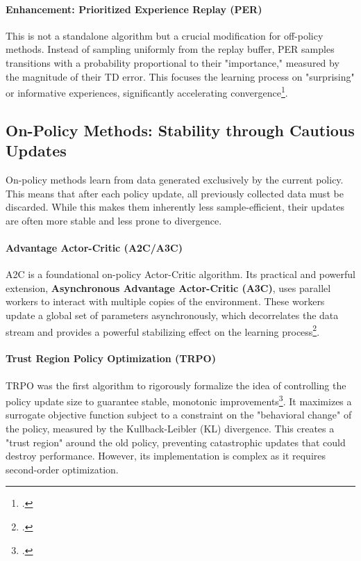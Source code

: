 \paragraph{Enhancement: Prioritized Experience Replay (PER)}
This is not a standalone algorithm but a crucial modification for off-policy methods. Instead of sampling uniformly from the replay buffer, PER samples transitions with a probability proportional to their "importance," measured by the magnitude of their TD error. This focuses the learning process on "surprising" or informative experiences, significantly accelerating convergence\footcite{schaul2015prioritized}.

\subsection{On-Policy Methods: Stability through Cautious Updates}
On-policy methods learn from data generated exclusively by the current policy. This means that after each policy update, all previously collected data must be discarded. While this makes them inherently less sample-efficient, their updates are often more stable and less prone to divergence.

\paragraph{Advantage Actor-Critic (A2C/A3C)}
A2C is a foundational on-policy Actor-Critic algorithm. Its practical and powerful extension, \textbf{Asynchronous Advantage Actor-Critic (A3C)}, uses parallel workers to interact with multiple copies of the environment. These workers update a global set of parameters asynchronously, which decorrelates the data stream and provides a powerful stabilizing effect on the learning process\footcite{mnih2016asynchronous}.

\paragraph{Trust Region Policy Optimization (TRPO)}
TRPO was the first algorithm to rigorously formalize the idea of controlling the policy update size to guarantee stable, monotonic improvements\footcite{schulman2015trust}. It maximizes a surrogate objective function subject to a constraint on the "behavioral change" of the policy, measured by the Kullback-Leibler (KL) divergence. This creates a "trust region" around the old policy, preventing catastrophic updates that could destroy performance. However, its implementation is complex as it requires second-order optimization.

